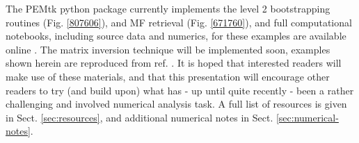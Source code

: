 \documentclass[10pt]{article}
\begin{document}

The PEMtk python package \cite{hockett2021PEMtkDocs, hockett2021PEMtkGithub} currently implements the level 2 bootstrapping routines (Fig. \ref{807606}), and MF retrieval (Fig. \ref{671760}), and full computational notebooks, including source data and numerics, for these examples are available online \cite{hockett2022MFreconFigshare}. The matrix inversion technique will be implemented soon, examples shown herein are reproduced from ref. \cite{gregory2021MolecularFramePhotoelectron}. It is hoped that interested readers will make use of these materials, and that this presentation will encourage other readers to try (and build upon) what has - up until quite recently - been a rather challenging and involved numerical analysis task. A full list of resources is given in Sect. \ref{sec:resources}, and additional numerical notes in Sect. \ref{sec:numerical-notes}.
\end{document}
